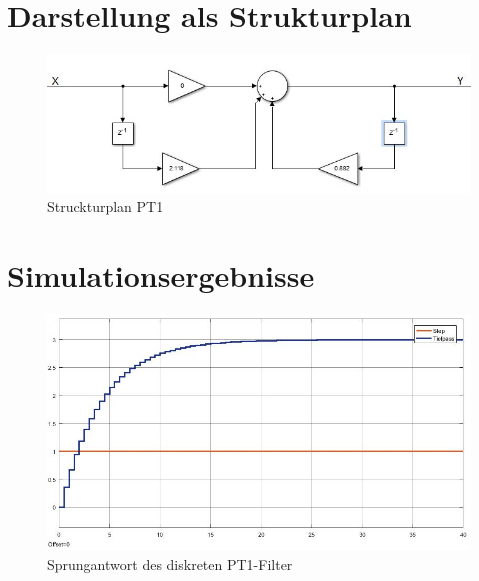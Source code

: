 \documentclass[12pt,a4paper]{report}
\begin{document}
\section{Darstellung als Strukturplan}
\begin{figure}[ht]
	\centering
	\includegraphics[width=0.8\linewidth]{marius/PT1}
	\caption{Struckturplan PT1}
	\label{fig:PT1}
\end{figure}

\section{Simulationsergebnisse}
\begin{figure}[ht]
	\centering
	\includegraphics[width=0.9\linewidth]{marius/PT1_Step}
	\caption{Sprungantwort des diskreten PT1-Filter}
	\label{fig:PT1_Step}
\end{figure}
\end{document}

